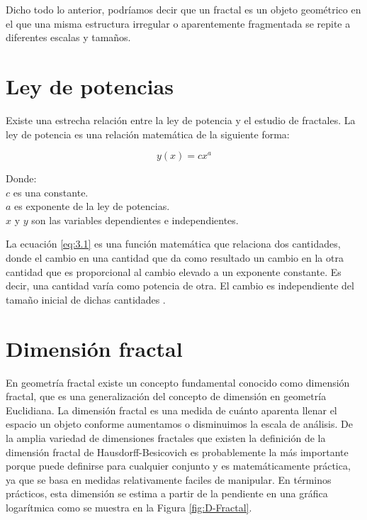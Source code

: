 Dicho todo lo anterior, podríamos decir que un fractal es un objeto geométrico en el que una misma estructura irregular o aparentemente fragmentada se repite a diferentes escalas y tamaños. 

\section{Ley de potencias} 

Existe una estrecha relación entre la ley de potencia y el estudio de fractales. La ley de potencia es una relación matemática de la siguiente forma:

\begin{equation}
	y(x) = cx^{a}
	\label{eq:3.1}
\end{equation}

Donde:\\
$c$ es una constante.\\
$a$ es exponente de la ley de potencias.\\
$x$ y $y$ son las variables dependientes e independientes. 

La ecuación \ref{eq:3.1} es una función matemática que relaciona dos cantidades, donde el cambio en una cantidad que da como resultado un cambio en la otra cantidad que es proporcional al cambio elevado a un exponente constante. Es decir, una cantidad varía como potencia de otra. El cambio es independiente del tamaño inicial de dichas cantidades \cite{Meakin1998}.


\section{Dimensi\'{o}n fractal}

En geometr\'{i}a fractal existe un concepto fundamental conocido como dimensi\'{o}n fractal, que es una generalizaci\'{o}n del concepto de dimensi\'{o}n en geometr\'{i}a Euclidiana. La dimensi\'{o}n fractal es una medida de cu\'{a}nto aparenta llenar el espacio un objeto conforme aumentamos o disminuimos la escala de an\'{a}lisis. De la  amplia variedad de dimensiones fractales que existen la definición de la dimensión fractal de Hausdorff-Besicovich es probablemente la más importante porque puede definirse para cualquier conjunto y es matemáticamente práctica, ya que se basa en medidas relativamente faciles de manipular. En t\'{e}rminos pr\'{a}cticos, esta dimensi\'{o}n se estima a partir de la pendiente en una gr\'{a}fica logar\'{i}tmica como se muestra en la Figura \ref{fig:D-Fractal}.


